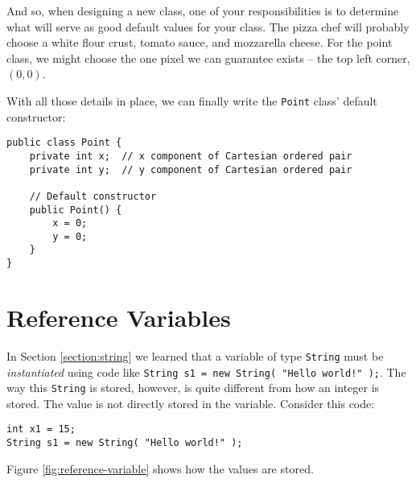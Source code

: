 And so, when designing a new class, one of your responsibilities is to determine what will serve as good default values for your class.  The pizza chef will probably choose a white flour crust, tomato sauce, and mozzarella cheese.  For the point class, we might choose the one pixel we can guarantee exists -- the top left corner, $(0,0)$.

With all those details in place, we can finally write the \texttt{Point} class' default constructor:

\begin{verbatim}
public class Point {
    private int x;  // x component of Cartesian ordered pair
    private int y;  // y component of Cartesian ordered pair

    // Default constructor
    public Point() {
        x = 0;
        y = 0;
    }
}
\end{verbatim}


\section{Reference Variables}
\label{section:reference-variables}

In Section \ref{section:string} we learned that a variable of type \texttt{String} must be \textit{instantiated} using code like \texttt{String s1 = new String( "Hello world!" );}.  The way this \texttt{String} is stored, however, is quite different from how an integer is stored.  The value is not directly stored in the variable.  Consider this code:

\begin{verbatim}
int x1 = 15;
String s1 = new String( "Hello world!" );
\end{verbatim}

Figure \ref{fig:reference-variable} shows how the values are stored.


